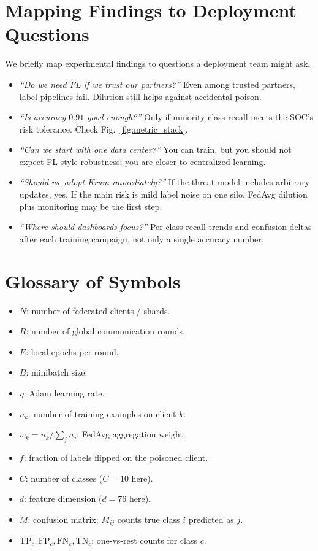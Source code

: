 \documentclass[journal]{IEEEtran}
\begin{document}
\section{Mapping Findings to Deployment Questions}
\label{app:deploy}
We briefly map experimental findings to questions a deployment team might ask.
\begin{itemize}
\item \emph{``Do we need FL if we trust our partners?''} Even among trusted partners, label pipelines fail. Dilution still helps against accidental poison.
\item \emph{``Is accuracy $0.91$ good enough?''} Only if minority-class recall meets the SOC's risk tolerance. Check Fig.~\ref{fig:metric_stack}.
\item \emph{``Can we start with one data center?''} You can train, but you should not expect FL-style robustness; you are closer to centralized learning.
\item \emph{``Should we adopt Krum immediately?''} If the threat model includes arbitrary updates, yes. If the main risk is mild label noise on one silo, FedAvg dilution plus monitoring may be the first step.
\item \emph{``Where should dashboards focus?''} Per-class recall trends and confusion deltas after each training campaign, not only a single accuracy number.
\end{itemize}

\section{Glossary of Symbols}
\label{app:glossary}
\begin{itemize}
\item $N$: number of federated clients / shards.
\item $R$: number of global communication rounds.
\item $E$: local epochs per round.
\item $B$: minibatch size.
\item $\eta$: Adam learning rate.
\item $n_k$: number of training examples on client $k$.
\item $w_k=n_k/\sum_j n_j$: FedAvg aggregation weight.
\item $f$: fraction of labels flipped on the poisoned client.
\item $C$: number of classes ($C=10$ here).
\item $d$: feature dimension ($d=76$ here).
\item $M$: confusion matrix; $M_{ij}$ counts true class $i$ predicted as $j$.
\item $\mathrm{TP}_c,\mathrm{FP}_c,\mathrm{FN}_c,\mathrm{TN}_c$: one-vs-rest counts for class $c$.
\end{itemize}
\end{document}
